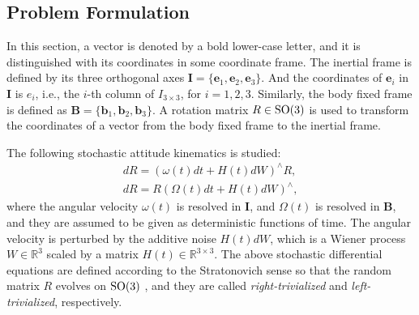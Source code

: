 \subsection{Problem Formulation}

In this section, a vector is denoted by a bold lower-case letter, and it is distinguished with its coordinates in some coordinate frame.
The inertial frame is defined by its three orthogonal axes $\mathbf{I} = \{\bm{e}_1, \bm{e}_2, \bm{e}_3\}$.
And the coordinates of $\bm{e}_i$ in $\mathbf{I}$ is $e_i$, i.e., the $i$-th column of $I_{3\times 3}$, for $i=1,2,3$.
Similarly, the body fixed frame is defined as $\mathbf{B} = \{\bm{b}_1, \bm{b}_2, \bm{b}_3\}$.
A rotation matrix $R\in\mathrm{SO}(3)$ is used to transform the coordinates of a vector from the body fixed frame to the inertial frame.

The following stochastic attitude kinematics is studied:
\begin{align}
	dR = (\omega(t) dt + H(t) dW)^\wedge R, \label{eqn:observability-kinematics-right} \\
	dR = R (\Omega(t) dt + H(t) dW)^\wedge, \label{eqn:observability-kinematics-left}
\end{align}
where the angular velocity $\omega(t)$ is resolved in $\mathbf{I}$, and $\Omega(t)$ is resolved in $\mathbf{B}$, and they are assumed to be given as deterministic functions of time.
The angular velocity is perturbed by the additive noise $H(t)dW$, which is a Wiener process $W\in\mathbb{R}^3$ scaled by a matrix $H(t)\in\mathbb{R}^{3\times 3}$. 
The above stochastic differential equations are defined according to the Stratonovich sense so that the random matrix $R$ evolves on $\mathrm{SO}(3)$ \cite{barrau2018stochastic}, and they are called \textit{right-trivialized} and \textit{left-trivialized}, respectively.

